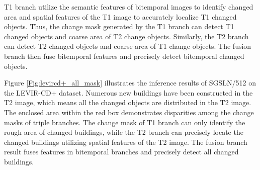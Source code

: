 \documentclass[journal]{IEEEtran}
\begin{document}
T1 branch utilize the semantic features of bitemporal images to identify changed area and spatial features of the T1 image to accurately localize T1 changed objects. Thus, the change mask generated by the T1 branch can detect T1 changed objects and coarse area of T2 change objects. Similarly, the T2 branch can detect T2 changed objects and coarse area of T1 change objects. The fusion branch then fuse bitemporal features and precisely detect bitemporal changed objects.

Figure \ref{Fig:levircd+_all_mask} illustrates the inference results of SGSLN/512 on the LEVIR-CD+ dataset. Numerous new buildings have been constructed in the T2 image, which means all the changed objects are distributed in the T2 image. The enclosed area within the red box demonstrates disparities among the change masks of triple branches. The change mask of T1 branch can only identify the rough area of changed buildings, while the T2 branch can precisely locate the changed buildings utilizing spatial features of the T2 image. The fusion branch result fuses features in bitemporal branches and precisely detect all changed buildings.

\begin{figure*}[!ht] \centering
{}
\caption{Sample inference results of SGSLN/512 with results of triple branches on the LEVIR-CD+ dataset. (a) T1 image. (b) T2 image. (c) Ground truth image. (d) SGSLN/512 result in fusion branch. (e) SGSLN/512 result in T1 branch. (f) SGSLN/512 result in T2 branch.}
\label{Fig:levircd+_all_mask}
\end{figure*}
\end{document}
